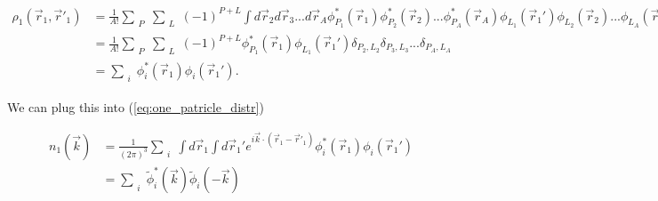 \documentclass[12pt]{article}
\begin{document}
\begin{align}
\rho_1(\vec{r}_1,\vec{r}'_1) & = \frac{1}{A!} 	 \sum_{\substack{P}} \sum_{\substack{L}} (-1)^{P+L} \int d\vec{r}_2 d\vec{r}_3 ... d\vec{r}_A 
\phi^*_{P_1}(\vec{r}_1)\phi^*_{P_2}(\vec{r}_2)...\phi^*_{P_A}(\vec{r}_A)
\phi_{L_1}(\vec{r}_1')\phi_{L_2}(\vec{r}_2)...\phi_{L_A}(\vec{r}_A) \\
&  = \frac{1}{A!} 	 \sum_{\substack{P}} \sum_{\substack{L}} (-1)^{P+L} \phi^*_{P_1}(\vec{r}_1) \phi_{L_1}(\vec{r}_1') 
\delta_{P_2,L_2}\delta_{P_3,L_3}...\delta_{P_A,L_A} \\
& = \sum_{\substack{i}} \phi^*_i(\vec{r}_1) \phi_i(\vec{r}_1').
\end{align}

We can plug this into (\ref{eq:one_patricle_distr})

\begin{align} 
	n_1(\vec{k})&=\frac{1}{(2\pi)^3} \sum_{\substack{i}} \int d\vec{r}_1 \int d\vec{r}_1' e^{i\vec{k}\cdot (\vec{r}_1-\vec{r}'_1)}
	\phi^*_i(\vec{r}_1)\phi_i(\vec{r}_1') \\
	& = \sum_{\substack{i}} \tilde{\phi}^*_i(\vec{k})\tilde{\phi}_i(-\vec{k})
\end{align}
	
\end{document}
